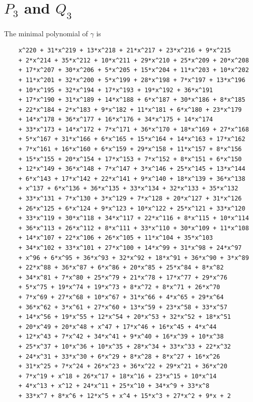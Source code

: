 \documentclass{scrartcl}
\theoremstyle{definition}
\begin{document}
\section{$P_3$ and $Q_3$}
\label{sec:numerical_values}
The minimal polynomial of $\gamma$ is
\begin{lstlisting}
    x^220 + 31*x^219 + 13*x^218 + 21*x^217 + 23*x^216 + 9*x^215 
    + 2*x^214 + 35*x^212 + 10*x^211 + 29*x^210 + 25*x^209 + 20*x^208 
    + 17*x^207 + 30*x^206 + 5*x^205 + 15*x^204 + 11*x^203 + 10*x^202 
    + 11*x^201 + 32*x^200 + 5*x^199 + 28*x^198 + 7*x^197 + 13*x^196 
    + 10*x^195 + 32*x^194 + 17*x^193 + 19*x^192 + 36*x^191 
    + 17*x^190 + 31*x^189 + 14*x^188 + 6*x^187 + 30*x^186 + 8*x^185 
    + 22*x^184 + 2*x^183 + 9*x^182 + 11*x^181 + 6*x^180 + 23*x^179 
    + 14*x^178 + 36*x^177 + 16*x^176 + 34*x^175 + 14*x^174 
    + 33*x^173 + 14*x^172 + 7*x^171 + 36*x^170 + 18*x^169 + 27*x^168 
    + 5*x^167 + 31*x^166 + 6*x^165 + 15*x^164 + 14*x^163 + 17*x^162 
    + 7*x^161 + 16*x^160 + 6*x^159 + 29*x^158 + 11*x^157 + 8*x^156 
    + 15*x^155 + 20*x^154 + 17*x^153 + 7*x^152 + 8*x^151 + 6*x^150 
    + 12*x^149 + 36*x^148 + 7*x^147 + 3*x^146 + 25*x^145 + 13*x^144 
    + 6*x^143 + 17*x^142 + 22*x^141 + 9*x^140 + 18*x^139 + 36*x^138 
    + x^137 + 6*x^136 + 36*x^135 + 33*x^134 + 32*x^133 + 35*x^132 
    + 33*x^131 + 7*x^130 + 3*x^129 + 7*x^128 + 20*x^127 + 31*x^126 
    + 26*x^125 + 6*x^124 + 9*x^123 + 10*x^122 + 25*x^121 + 33*x^120 
    + 33*x^119 + 30*x^118 + 34*x^117 + 22*x^116 + 8*x^115 + 10*x^114 
    + 36*x^113 + 26*x^112 + 8*x^111 + 33*x^110 + 30*x^109 + 11*x^108 
    + 14*x^107 + 22*x^106 + 26*x^105 + 11*x^104 + 35*x^103 
    + 34*x^102 + 33*x^101 + 27*x^100 + 14*x^99 + 31*x^98 + 24*x^97 
    + x^96 + 6*x^95 + 36*x^93 + 32*x^92 + 18*x^91 + 36*x^90 + 3*x^89 
    + 22*x^88 + 36*x^87 + 6*x^86 + 20*x^85 + 25*x^84 + 8*x^82 
    + 34*x^81 + 7*x^80 + 25*x^79 + 21*x^78 + 17*x^77 + 29*x^76 
    + 5*x^75 + 19*x^74 + 19*x^73 + 8*x^72 + 8*x^71 + 26*x^70 
    + 7*x^69 + 27*x^68 + 10*x^67 + 31*x^66 + 4*x^65 + 29*x^64 
    + 36*x^62 + 3*x^61 + 27*x^60 + 13*x^59 + 23*x^58 + 33*x^57 
    + 14*x^56 + 19*x^55 + 12*x^54 + 20*x^53 + 32*x^52 + 18*x^51 
    + 20*x^49 + 20*x^48 + x^47 + 17*x^46 + 16*x^45 + 4*x^44 
    + 12*x^43 + 7*x^42 + 34*x^41 + 9*x^40 + 16*x^39 + 10*x^38 
    + 25*x^37 + 10*x^36 + 10*x^35 + 28*x^34 + 33*x^33 + 22*x^32 
    + 24*x^31 + 33*x^30 + 6*x^29 + 8*x^28 + 8*x^27 + 16*x^26 
    + 31*x^25 + 7*x^24 + 26*x^23 + 36*x^22 + 29*x^21 + 36*x^20 
    + 7*x^19 + x^18 + 26*x^17 + 18*x^16 + 23*x^15 + 10*x^14 
    + 4*x^13 + x^12 + 24*x^11 + 25*x^10 + 34*x^9 + 33*x^8 
    + 33*x^7 + 8*x^6 + 12*x^5 + x^4 + 15*x^3 + 27*x^2 + 9*x + 2
\end{lstlisting}
\end{document}
